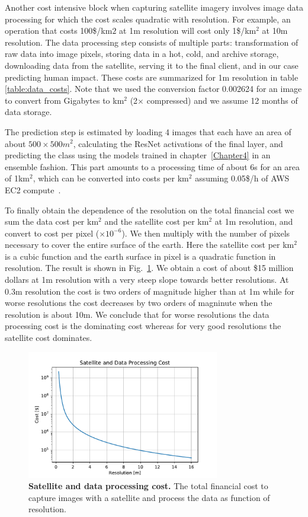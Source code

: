 Another cost intensive block when capturing satellite imagery involves image data processing for which the cost scales quadratic with resolution. For example, an operation that costs 100\$/km$2$ at 1m resolution will cost only 1\$/km$^2$ at 10m resolution. The data processing step consists of multiple parts: transformation of raw data into image pixels, storing data in a hot, cold, and archive storage, downloading data from the satellite, serving it to the final client, and in our case predicting human impact. These costs are summarized for 1m resolution in table \ref{table:data_costs}. Note that we used the conversion factor 0.002624 for an image to convert from Gigabytes to km$^2$ (2$\times$ compressed) and we assume 12 months of data storage. 

The prediction step is estimated by loading 4 images that each have an area of about $500\times500m^2$, calculating the ResNet activations of the final layer, and predicting the class using the models trained in chapter~\ref{Chapter4} in an ensemble fashion. This part amounts to a processing time of about 6s for an area of 1km$^2$, which can be converted into costs per km$^2$ assuming 0.05\$/h of AWS EC2 compute~\parencite{aws}.

To finally obtain the dependence of the resolution on the total financial cost we sum the data cost per km$^2$ and the satellite cost per km$^2$ at 1m resolution, and convert to cost per pixel ($\times 10^{-6}$). We then multiply with the number of pixels necessary to cover the entire surface of the earth. Here the satellite cost per km$^2$ is a cubic function and the earth surface in pixel is a quadratic function in resolution. The result is shown in Fig.~\ref{fig:costs}. We obtain a cost of about \$15 million dollars at 1m resolution with a very steep slope towards better resolutions. At 0.3m resolution the cost is two orders of magnitude higher than at 1m while for worse resolutions the cost decreases by two orders of magninute when the resolution is about 10m. We conclude that for worse resolutions the data processing cost is the dominating cost whereas for very good resolutions the satellite cost dominates.

\begin{figure}[h!]
	\centering
	\includegraphics[width=0.75\textwidth]{Figures/costs.pdf}
	\captionsetup{width=1\linewidth}
	\caption{\textbf{Satellite and data processing cost.} The total financial cost to capture images with a satellite and process the data as function of resolution.}
	\label{fig:costs}
\end{figure}


